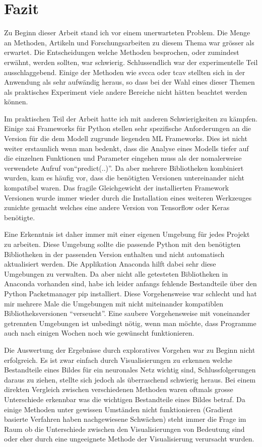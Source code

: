 \documentclass[
  12pt, %
  a4paper, %
  oneside, %
  openany, 
  numbers=noenddot, %
  BCOR=5mm, %
  parskip=half*, %
  thesis, %
]{bfhbook}
\begin{document}
\chapter{Fazit}
Zu Beginn dieser Arbeit stand ich vor einem unerwarteten Problem. Die Menge an Methoden, Artikeln und Forschungsarbeiten zu diesem Thema war grösser als erwartet. Die Entscheidungen welche Methoden besprochen, oder zumindest erwähnt, werden sollten, war schwierig. Schlussendlich war der experimentelle Teil ausschlaggebend. Einige der Methoden wie \acrshort{svcca} oder \acrshort{tcav} stellten sich in der Anwendung als sehr aufwändig heraus, so dass bei der Wahl eines dieser Themen als praktisches Experiment viele andere Bereiche nicht hätten beachtet werden können.

Im praktischen Teil der Arbeit hatte ich mit anderen Schwierigkeiten zu kämpfen. Einige \Gls{xai} Frameworks für Python stellen sehr spezifische Anforderungen an die Version für die dem Modell zugrunde liegenden \Gls{ML} Frameworks. Dies ist nicht weiter erstaunlich wenn man bedenkt, dass die Analyse eines Modells tiefer auf die einzelnen Funktionen und Parameter eingehen muss als der nomalerweise verwendete Aufruf  von``predict(..)''. Da aber mehrere Bibliotheken kombiniert wurden, kam es häufig vor, dass die benötigten Versionen untereinander nicht kompatibel waren. Das fragile Gleichgewicht der installierten Framework Versionen wurde immer wieder durch die Installation eines weiteren Werkzeuges zunichte gemacht welches eine andere Version von Tensorflow oder Keras benötigte. 

Eine Erkenntnis ist daher immer mit einer eigenen Umgebung für jedes Projekt zu arbeiten. Diese Umgebung sollte die passende Python mit den benötigten Bibliotheken in der passenden Version enthalten und nicht automatisch aktualisiert werden. Die Applikation Anaconda hilft dabei sehr diese Umgebungen zu verwalten. Da aber nicht alle getesteten Bibliotheken in Anaconda vorhanden sind, habe ich leider anfangs fehlende Bestandteile über den Python Packetmanager pip installiert. Diese Vorgehensweise war schlecht und hat mir mehrere Male die Umgebungen mit nicht miteinander kompatiblen Bibliotheksversionen ``verseucht''. Eine saubere Vorgehensweise mit voneinander getrennten Umgebungen ist unbedingt nötig, wenn man möchte, dass Programme auch nach einigen Wochen noch wie gewünscht funktionieren.

Die Auswertung der Ergebnisse durch exploratives Vorgehen war zu Beginn nicht erfolgreich. Es ist zwar einfach durch Visualisierungen zu erkennen welche Bestandteile eines Bildes für ein neuronales Netz wichtig sind, Schlussfolgerungen daraus zu ziehen, stellte sich jedoch als überraschend schwierig heraus. Bei einem direkten Vergleich zwischen verschiedenen Methoden waren oftmals grosse Unterschiede erkennbar was die wichtigen Bestandteile eines Bildes betraf. Da einige Methoden unter gewissen Umständen nicht funktionieren (Gradient basierte Verfahren haben nachgewiesene Schwächen) steht immer die Frage im Raum ob die Unterschiede zwischen den Visualisierungen von Bedeutung sind oder eher durch eine ungeeignete Methode der Visualisierung verursacht wurden. 
\end{document}
